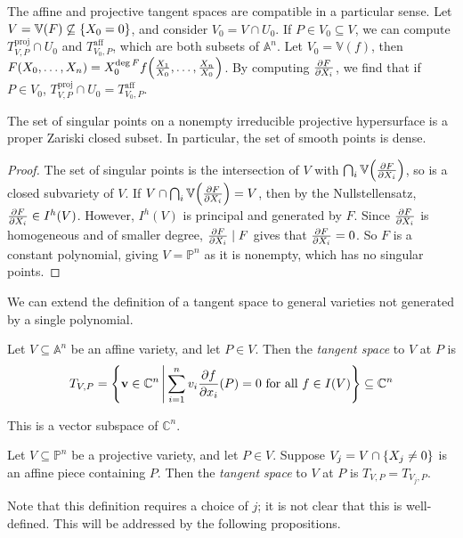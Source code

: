 The affine and projective tangent spaces are compatible in a particular sense.
Let \( V = \mathbb V(F) \not\subseteq \qty{X_0 = 0} \), and consider \( V_0 = V \cap U_0 \).
If \( P \in V_0 \subseteq V \), we can compute \( T_{V,P}^{\mathrm{proj}} \cap U_0 \) and \( T_{V_0,P}^{\mathrm{aff}} \), which are both subsets of \( \mathbb A^n \).
Let \( V_0 = \mathbb V(f) \), then \( F(X_0, \dots, X_n) = X_0^{\deg F} f\qty(\frac{X_1}{X_0}, \dots, \frac{X_n}{X_0}) \).
By computing \( \pdv{F}{X_i} \), we find that if \( P \in V_0 \), \( T_{V,P}^{\mathrm{proj}} \cap U_0 = T_{V_0,P}^{\mathrm{aff}} \).
\begin{proposition}
    The set of singular points on a nonempty irreducible projective hypersurface is a proper Zariski closed subset.
    In particular, the set of smooth points is dense.
\end{proposition}
\begin{proof}
    The set of singular points is the intersection of \( V \) with \( \bigcap_i \mathbb V\qty(\pdv{F}{X_i}) \), so is a closed subvariety of \( V \).
    If \( V \cap \bigcap_i \mathbb V\qty(\pdv{F}{X_i}) = V \), then by the Nullstellensatz, \( \pdv{F}{X_i} \in I^h(V) \).
    However, \( I^h(V) \) is principal and generated by \( F \).
    Since \( \pdv{F}{X_i} \) is homogeneous and of smaller degree, \( \pdv{F}{X_i} \mid F \) gives that \( \pdv{F}{X_i} = 0 \).
    So \( F \) is a constant polynomial, giving \( V = \mathbb P^n \) as it is nonempty, which has no singular points.
\end{proof}
We can extend the definition of a tangent space to general varieties not generated by a single polynomial.
\begin{definition}
    Let \( V \subseteq \mathbb A^n \) be an affine variety, and let \( P \in V \).
    Then the \emph{tangent space} to \( V \) at \( P \) is
    \[ T_{V,P} = \qty{\vb v \in \mathbb C^n \,\middle|\,\sum_{i=1}^n v_i \pdv{f}{x_i}\qty(P) = 0 \text{ for all } f \in I(V)} \subseteq \mathbb C^n \]
\end{definition}
This is a vector subspace of \( \mathbb C^n \).
\begin{definition}
    Let \( V \subseteq \mathbb P^n \) be a projective variety, and let \( P \in V \).
    Suppose \( V_j = V \cap \qty{X_j \neq 0} \) is an affine piece containing \( P \).
    Then the \emph{tangent space} to \( V \) at \( P \) is \( T_{V,P} = T_{V_j,P} \).
\end{definition}
Note that this definition requires a choice of \( j \); it is not clear that this is well-defined.
This will be addressed by the following propositions.

